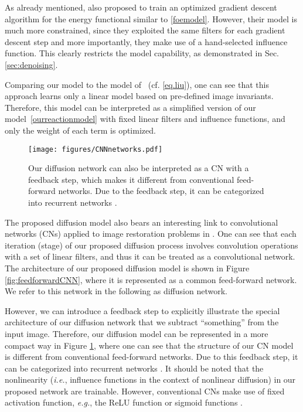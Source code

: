 \documentclass[10pt,journal,compsoc]{IEEEtran}
\newcommand{\eg}{\emph{e.g.}}
\newcommand{\ie}{\emph{i.e.}}
\begin{document}
{As already mentioned, \cite{Barbu2009, DomkeAISTATS2012} also proposed to train an optimized gradient descent algorithm for the energy functional 
similar to \eqref{foemodel}. However, their model is much more constrained, since they exploited the same 
filters for each gradient descent step and more importantly, they make use of a hand-selected influence function. This clearly restricts the model capability, as demonstrated in Sec. \ref{sec:denoising}. 

Comparing our model to the model of~\cite{liu2010learning}
(cf. \eqref{eq.liu}), one can see that this approach learns only a
linear model based on pre-defined image invariants. Therefore, this
model can be interpreted as a simplified version of our
model~\eqref{ourreactionmodel} with fixed linear filters and influence
functions, and only the weight of each term is optimized.}


\begin{figure}[t!]
\centering
\vspace{-0.5cm}
\hspace*{-0.8cm} {\texttt{[image: figures/CNNnetworks.pdf]}}
\vspace*{-1cm}
\caption{Our diffusion network can also be interpreted as a CN with a 
feedback step, which makes it different from conventional feed-forward networks. Due to the feedback step, 
it can be categorized into recurrent networks \cite{graves2009offline}. 
}\label{fig:recurrentCNN}
\vspace{-0.4cm}
\end{figure}

The proposed diffusion model also bears an interesting link to 
convolutional networks (CNs) applied to 
image restoration problems in \cite{CNNdenoising}. One can see that 
each iteration (stage) of our proposed diffusion process involves convolution 
operations with a set of linear filters, 
and thus it can be treated as a convolutional network. 
The architecture of our proposed diffusion model is shown in Figure \ref{fig:feedforwardCNN}, where it is represented as 
a common feed-forward network. We refer to this network in the following as diffusion network. 

However, we can introduce a feedback step to explicitly illustrate the special 
architecture of our diffusion network that we subtract ``something'' from the input image. Therefore, our diffusion model 
can be represented in a more compact way in Figure \ref{fig:recurrentCNN}, 
where one can see that the structure of our CN model is different from conventional feed-forward networks. 
Due to this feedback step, it can be categorized into recurrent networks \cite{graves2009offline}. 
It should be noted that the nonlinearity (\ie, influence functions in the context of nonlinear diffusion) 
in our proposed network are trainable. However, conventional CNs make use of 
fixed activation function, \eg, the ReLU function 
\cite{nair2010rectified} or sigmoid functions 
\cite{CNNdenoising}. 
\end{document}
